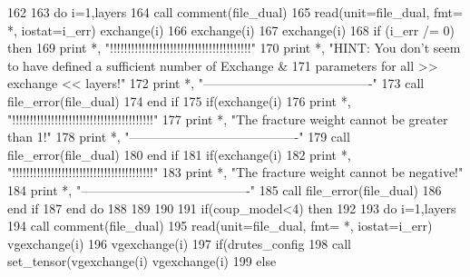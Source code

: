 \begin{DoxyCode}
162     
163       \textcolor{keywordflow}{do} i=1,layers
164         \textcolor{keyword}{call }comment(file\_dual)
165         \textcolor{keyword}{read}(unit=file\_dual, fmt= *, iostat=i\_err) exchange(i)%
166         exchange(i)%
167             exchange(i)%
168         \textcolor{keywordflow}{if} (i\_err /= 0) \textcolor{keywordflow}{then}
169           print *, \textcolor{stringliteral}{"!!!!!!!!!!!!!!!!!!!!!!!!!!!!!!!!!!!!!!!!"}
170           print *, \textcolor{stringliteral}{"HINT: You don't seem to have defined a sufficient number of Exchange &}
171 \textcolor{stringliteral}{}\textcolor{stringliteral}{           parameters for all >> exchange << layers!"}
172           print *, \textcolor{stringliteral}{"----------------------------------------"}
173           \textcolor{keyword}{call }file_error(file\_dual)
174 \textcolor{keywordflow}{        end if}
175         \textcolor{keywordflow}{if}(exchange(i)%
176           print *, \textcolor{stringliteral}{"!!!!!!!!!!!!!!!!!!!!!!!!!!!!!!!!!!!!!!!!"}
177           print *, \textcolor{stringliteral}{"The fracture weight cannot be greater than 1!"}
178           print *, \textcolor{stringliteral}{"----------------------------------------"}
179           \textcolor{keyword}{call }file_error(file\_dual)
180 \textcolor{keywordflow}{        end if}
181         \textcolor{keywordflow}{if}(exchange(i)%
182           print *, \textcolor{stringliteral}{"!!!!!!!!!!!!!!!!!!!!!!!!!!!!!!!!!!!!!!!!"}
183           print *, \textcolor{stringliteral}{"The fracture weight cannot be negative!"}
184           print *, \textcolor{stringliteral}{"----------------------------------------"}
185           \textcolor{keyword}{call }file_error(file\_dual)
186 \textcolor{keywordflow}{        end if}
187 \textcolor{keywordflow}{      end do}
188       
189 
190 
191     \textcolor{keywordflow}{if}(coup_model<4) \textcolor{keywordflow}{then}
192 
193      \textcolor{keywordflow}{do} i=1,layers
194         \textcolor{keyword}{call }comment(file\_dual)
195         \textcolor{keyword}{read}(unit=file\_dual, fmt= *, iostat=i\_err) vgexchange(i)%
196         vgexchange(i)%
197         \textcolor{keywordflow}{if}(drutes_config%
198             \textcolor{keyword}{call }set_tensor(vgexchange(i)%
      vgexchange(i)%
199         \textcolor{keywordflow}{else}

\end{DoxyCode}

